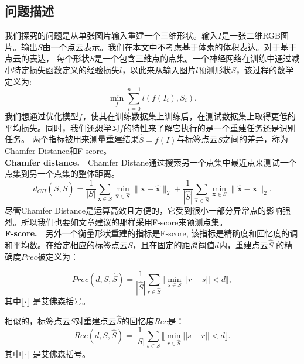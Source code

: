 \documentclass[bachelor, nocolorlinks, printoneside]{seuthesis} %
\begin{document}
\begin{Main}
\section{问题描述}
我们探究的问题是从单张图片输入重建一个三维形状。输入$I$是一张二维RGB图片。输出$S$由一个点云表示。我们在本文中不考虑基于体素的体积表达。对于基于点云的表达，
每个形状$S$是一个包含三维点的点集。一个神经网络在训练中通过减小特定损失函数定义的经验损失$l$，以此来从输入图片$l$预测形状$S$，该过程的数学定义为:
\begin{equation}
    \min_f \sum_{i=0}^{n-1} {l(f(I_i), S_i)}.
\end{equation}
我们想通过优化模型$f$，使其在训练数据集上训练后，在测试数据集上取得更低的平均损失。同时，我们还想学习$f$的特性来了解它执行的是一个重建任务还是识别任务。
两个指标被用来测量重建结果$\widehat{S} = f(I)$与标签点云$S$之间的差异，称为Chamfer Distance和F-score。
\\
\noindent
\textbf{Chamfer distance.}\label{sec:chamfer}~~Chamfer Distane通过搜索另一个点集中最近点来测试一个点集到另一个点集的整体距离。
\begin{equation}\label{eqn:chamfer}
	d_{CH}(S,\widehat{S}) = \frac{1}{|S|}\sum\limits_{\mathbf{x}\in S}\min_{\widehat{\mathbf{x}}\in \widehat{S}}\|\mathbf{x}-\widehat{\mathbf{x}}\|_2 + 
    \frac{1}{|\widehat{S}|}\sum\limits_{\widehat{\mathbf{x}}\in \widehat{S}}\min_{\mathbf{x}\in S}\|\widehat{\mathbf{x}} - \mathbf{x}\|_2.
\end{equation}
尽管Chamfer Distance是运算高效且方便的，它受到很小一部分异常点的影响强烈。所以我们也要如文章\cite{tatarchenko2019single}建议的那样采用F-score来预测点集。
\\
\noindent
\textbf{F-score.}\label{sec:fscore}~~另外一个衡量形状重建的指标是F-score, 该指标是精确度和回忆度的调和平均数。在给定相应的标签点云$S$，且在固定的距离阈值$d$内，重建点云$\widehat{S}$
的精确度$\textit{Prec}$被定义为：

\begin{equation} \label{eq:precision}
\textit{Prec}(\textit{d}, S, \widehat{S}) = \frac{1}{|\widehat{S}|} \sum_{r \in \widehat{S}} \llbracket \min_{s \in S} ||r-s || < \textit{d} \rrbracket,
\end{equation}
其中$\llbracket \cdot \rrbracket$ 是艾佛森括号。
    
相似的，标签点云$S$对重建点云$\widehat{S}$的回忆度$\textit{Rec}$是：
\begin{equation} \label{eq:recall}
    \textit{Rec}(\textit{d}, S, \widehat{S}) = \frac{1}{|S|} \sum_{s \in S} \llbracket \min_{r \in \widehat{S}} ||s-r || < \textit{d} \rrbracket.
    \end{equation}
其中$\llbracket \cdot \rrbracket$ 是艾佛森括号。


\end{Main}
\end{document}

